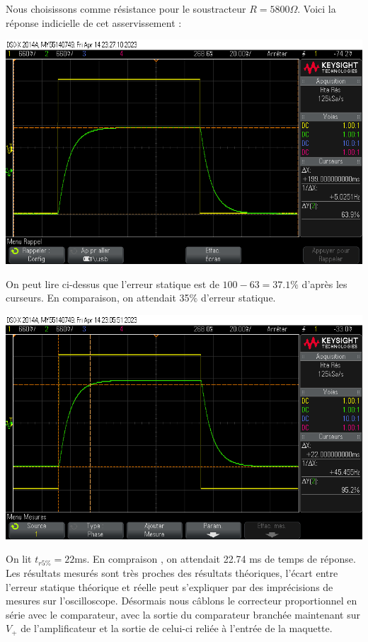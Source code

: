 \documentclass[12pt]{article}
\begin{document}
Nous choisissons comme résistance pour le soustracteur $R= 5800 \Omega$. Voici la réponse indicielle de cet asservissement : 
\begin{center}
    \includegraphics[width = 16cm]{TP3/Syst_1/P/14_04_2023_gs_k1_.png}
\end{center}
On peut lire ci-dessus que l'erreur statique est de $100 - 63 = 37.1\%$ d'après les curseurs. En comparaison, on attendait 35$\%$ d'erreur statique.
\begin{center}
    \includegraphics[width = 16cm]{TP3/Syst_1/P/14_04_2023_tr5_k1.png}
\end{center}
On lit $t_{r5\%} = 22$ms. En compraison , on attendait 22.74 ms de temps de réponse. Les résultats mesurés sont très proches des résultats théoriques, l'écart entre l'erreur statique théorique et réelle peut s'expliquer par des imprécisions de mesures sur l'oscilloscope.
Désormais nous câblons le correcteur proportionnel en série avec le comparateur, avec la sortie du comparateur branchée maintenant sur $V_+$ de l'amplificateur et la sortie de celui-ci reliée à l'entrée de la maquette.
\end{document}
